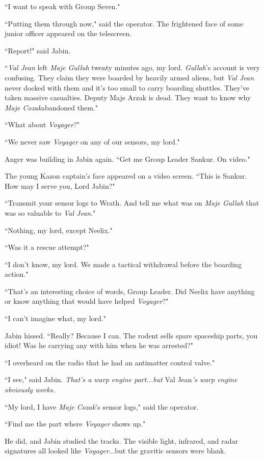 \documentclass[twoside,letterpaper,12pt]{memoir}
\begin{document}
``I want to speak with Group Seven."

``Putting them through now," said the operator. The frightened face of some junior officer appeared on the telescreen.

``Report!" said Jabin.

``\textit{Val Jean} left \textit{Maje Gulluh} twenty minutes ago, my lord. \textit{Gullah}'s account is very confusing. They claim they were boarded by heavily armed aliens, but \textit{Val Jean} never docked with them and it's too small to carry boarding shuttles. They've taken massive casualties. Deputy Maje Arzak is dead. They want to know why \textit{Maje Cozak}abandoned them."

``What about \textit{Voyager}?"

``We never saw \textit{Voyager} on any of our sensors, my lord."

Anger was building in Jabin again. ``Get me Group Leader Sankur. On video."

The young Kazon captain's face appeared on a video screen. ``This is Sankur. How may I serve you, Lord Jabin?"

``Transmit your sensor logs to Wrath. And tell me what was on \textit{Maje Gullah} that was so valuable to \textit{Val Jean}."

``Nothing, my lord, except Neelix."

``Was it a rescue attempt?"

``I don't know, my lord. We made a tactical withdrawal before the boarding action."

``That's an interesting choice of words, Group Leader. Did Neelix have anything or know anything that would have helped \textit{Voyager}?"

``I can't imagine what, my lord."

Jabin hissed. ``Really? Because I can. The rodent sells spare spaceship parts, you idiot! Was he carrying any with him when he was arrested?"

``I overheard on the radio that he had an antimatter control valve."

``I see," said Jabin. \textit{That's a warp engine part...but }Val Jean\textit{'s warp engine obviously works.}

``My lord, I have \textit{Maje Cozak}'s sensor logs," said the operator.

``Find me the part where \textit{Voyager} shows up."

He did, and Jabin studied the tracks. The visible light, infrared, and radar signatures all looked like \textit{Voyager}...but the gravitic sensors were blank.
\end{document}
